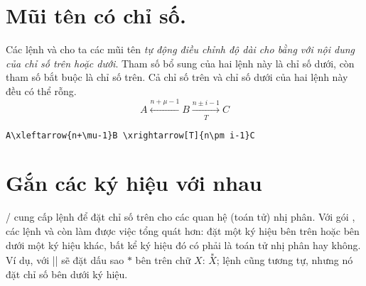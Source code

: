 \documentclass[11pt,leqno,titlepage,openany,oneside]{amsldoc}[1999/12/13]
\begin{document}
\section{Mũi tên có chỉ số.}

Các lệnh  và  cho ta các mũi tên \emph{tự động
điều chỉnh độ dài cho bằng với nội dung của chỉ số trên hoặc dưới}.
Tham số bổ sung của hai lệnh này là chỉ số dưới, còn tham số bắt buộc
là chỉ số trên. Cả chỉ số trên và chỉ số dưới của hai lệnh này đều có thể rỗng.
\begin{equation}
A\xleftarrow{n+\mu-1}B \xrightarrow[T]{n\pm i-1}C
\end{equation}
\begin{verbatim}
A\xleftarrow{n+\mu-1}B \xrightarrow[T]{n\pm i-1}C
\end{verbatim}


\section{Gắn các ký hiệu với nhau}

\latex/ cung cấp lệnh  để đặt chỉ số trên cho các quan hệ (toán tử)
nhị phân. Với gói , các lệnh  và 
còn làm được việc tổng quát hơn: đặt một ký hiệu bên trên hoặc bên dưới
một ký hiệu khác, bất kể ký hiệu đó có phải là toán tử nhị phân hay không.
Ví dụ, với || sẽ đặt dấu sao $*$ bên trên chữ $X$:
$\overset{*}{X}$; lệnh  cũng tương tự, nhưng nó đặt chỉ số
bên dưới ký hiệu.
\end{document}
